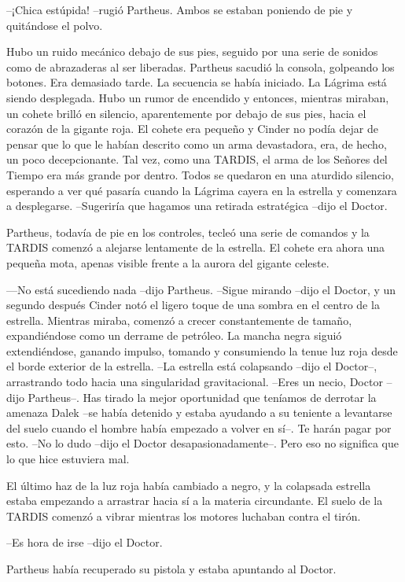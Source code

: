 --¡Chica estúpida! --rugió Partheus. Ambos se estaban poniendo de pie y quitándose el polvo.

Hubo un ruido mecánico debajo de sus pies, seguido por una serie de sonidos como de abrazaderas al ser liberadas. Partheus sacudió la consola, golpeando los botones. Era demasiado tarde. La secuencia se había iniciado. La Lágrima está siendo desplegada.
Hubo un rumor de encendido y entonces, mientras miraban, un cohete brilló en silencio, aparentemente por debajo de sus pies, hacia el corazón de la gigante roja.
El cohete era pequeño y Cinder no podía dejar de pensar que lo que le habían descrito como un arma devastadora, era, de hecho, un poco decepcionante. Tal vez, como una TARDIS, el arma de los Señores del Tiempo era más grande por dentro.
Todos se quedaron en una aturdido silencio, esperando a ver qué pasaría cuando la Lágrima cayera en la estrella y comenzara a desplegarse.
--Sugeriría que hagamos una retirada estratégica --dijo el Doctor.

Partheus, todavía de pie en los controles, tecleó una serie de comandos y la TARDIS comenzó a alejarse lentamente de la estrella.
El cohete era ahora una pequeña mota, apenas visible frente a la aurora del gigante celeste.

---No está sucediendo nada --dijo Partheus.
--Sigue mirando --dijo el Doctor, y un segundo después Cinder notó el ligero toque de una sombra en el centro de la estrella. Mientras miraba, comenzó a crecer constantemente de tamaño, expandiéndose como un derrame de petróleo. La mancha negra siguió extendiéndose, ganando impulso, tomando y consumiendo la tenue luz roja desde el borde exterior de la estrella.
--La estrella está colapsando --dijo el Doctor--, arrastrando todo hacia una singularidad gravitacional.
--Eres un necio, Doctor --dijo Partheus--. Has tirado la mejor oportunidad que teníamos de derrotar la amenaza Dalek --se había detenido y estaba ayudando a su teniente a levantarse del suelo cuando el hombre había empezado a volver en sí--. Te harán pagar por esto.
--No lo dudo --dijo el Doctor desapasionadamente--. Pero eso no significa que lo que hice estuviera mal.

El último haz de la luz roja había cambiado a negro, y la colapsada estrella estaba empezando a arrastrar hacia sí a la materia circundante. El suelo de la TARDIS comenzó a vibrar mientras los motores luchaban contra el tirón.

--Es hora de irse --dijo el Doctor.

Partheus había recuperado su pistola y estaba apuntando al Doctor.

